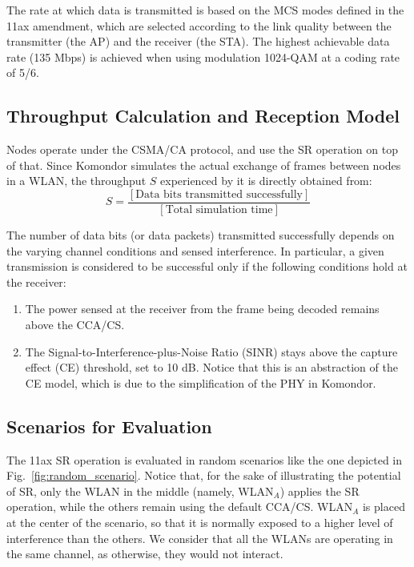 \documentclass[conference]{IEEEtran}
\begin{document}
	The rate at which data is transmitted is based on the MCS modes defined in the 11ax amendment, which are selected according to the link quality between the transmitter (the AP) and the receiver (the STA). The highest achievable data rate (135 Mbps) is achieved when using modulation 1024-QAM at a coding rate of 5/6.
	
	\subsection{Throughput Calculation and Reception Model}
	
	Nodes operate under the CSMA/CA protocol, and use the SR operation on top of that. Since Komondor simulates the actual exchange of frames between nodes in a WLAN, the throughput $S$ experienced by it is directly obtained from:
	\begin{equation}
	S = \frac{[\text{Data bits transmitted successfully}]}{[\text{Total simulation time}]}
	\nonumber
	\end{equation}
	
	The number of data bits (or data packets) transmitted successfully depends on the varying channel conditions and sensed interference. In particular, a given transmission is considered to be successful only if the following conditions hold at the receiver:
	\begin{enumerate}
		\item The power sensed at the receiver from the frame being decoded remains above the CCA/CS.
		\item The Signal-to-Interference-plus-Noise Ratio (SINR) stays above the capture effect (CE) threshold, set to 10 dB. Notice that this is an abstraction of the CE model, which is due to the simplification of the PHY in Komondor.
	\end{enumerate}
	
	\subsection{Scenarios for Evaluation}
	The 11ax SR operation is evaluated in random scenarios like the one depicted in Fig.~\ref{fig:random_scenario}. Notice that, for the sake of illustrating the potential of SR, only the WLAN in the middle (namely, WLAN$_A$) applies the SR operation, while the others remain using the default CCA/CS. WLAN$_A$ is placed at the center of the scenario, so that it is normally exposed to a higher level of interference than the others. We consider that all the WLANs are operating in the same channel, as otherwise, they would not interact.
	
\end{document}
